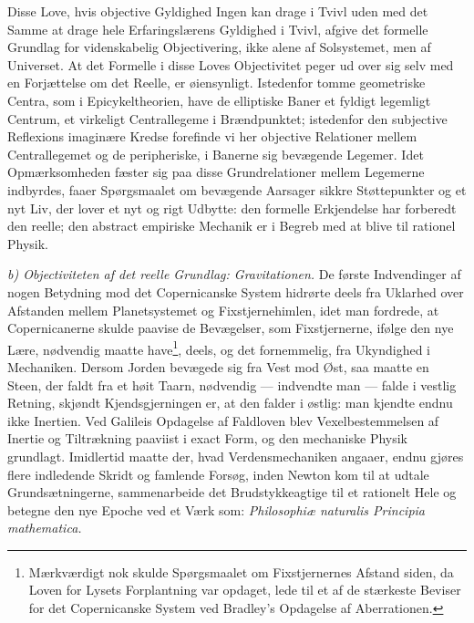 \documentclass[12pt,a4paper]{book}
\newcommand{\runin}[1]{\emph{#1}\hspace{0.4em}}
\begin{document}
Disse Love, hvis objective Gyldighed Ingen kan drage i Tvivl uden med
det Samme at drage hele Erfaringslærens Gyldighed i Tvivl, afgive det
formelle Grundlag for videnskabelig Objectivering, ikke alene af
Solsystemet, men af Universet. At det Formelle i disse Loves
Objectivitet peger ud over sig selv med en Forjættelse om det Reelle, er
øiensynligt. Istedenfor tomme geometriske Centra, som i
Epicykeltheorien, have de elliptiske Baner et fyldigt legemligt
Centrum, et virkeligt Centrallegeme i Brændpunktet; istedenfor den
subjective Reflexions imaginære Kredse forefinde vi her objective
Relationer mellem Centrallegemet og de peripheriske, i Banerne sig
bevægende Legemer. Idet Opmærksomheden fæster sig paa disse
Grundrelationer mellem Legemerne indbyrdes, faaer Spørgsmaalet om
bevægende Aarsager sikkre Støttepunkter og et nyt Liv, der lover et nyt
og rigt Udbytte: den formelle Erkjendelse har forberedt den reelle; den
abstract empiriske Mechanik er i Begreb med at blive til rationel
Physik.

\runin{b) Objectiviteten af det reelle Grundlag: Gravitationen.}
De første Indvendinger af nogen Betydning mod det Copernicanske System
hidrørte deels fra Uklarhed over Afstanden mellem Planetsystemet og
Fixstjernehimlen, idet man fordrede, at Copernicanerne skulde paavise de
Bevægelser, som Fixstjernerne, ifølge den nye Lære, nødvendig maatte
have\footnote{%
Mærkværdigt nok skulde Spørgsmaalet om Fixstjernernes Afstand siden, da
Loven for Lysets Forplantning var opdaget, lede til et af de stærkeste
Beviser for det Copernicanske System ved Bradley's Opdagelse af
Aberrationen.}, deels, og det fornemmelig, fra Ukyndighed i Mechaniken.
Dersom Jorden bevægede sig fra Vest mod Øst, saa maatte en Steen, der
faldt fra et høit Taarn, nødvendig --- indvendte man --- falde i vestlig
Retning, skjøndt Kjendsgjerningen er, at den falder i østlig: man
kjendte endnu ikke Inertien. Ved Galileis Opdagelse af Faldloven blev
Vexelbestemmelsen af Inertie og Tiltrækning paaviist i exact Form, og
den mechaniske Physik grundlagt. Imidlertid maatte der, hvad
Verdensmechaniken angaaer, endnu gjøres flere indledende Skridt og
famlende Forsøg, inden Newton kom til at udtale Grundsætningerne,
sammenarbeide det Brudstykkeagtige til et rationelt Hele og betegne den
nye
Epoche ved et Værk som: \textit{Philosophiæ naturalis Principia
mathematica.}
\end{document}
